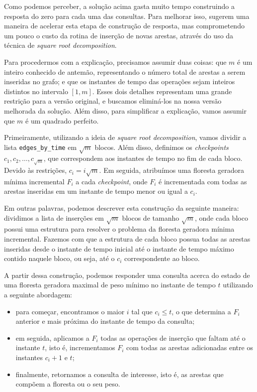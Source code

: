 Como podemos perceber, a solução acima gasta muito tempo construindo a resposta do zero para cada uma das consultas. Para melhorar isso, \citet{10.1093/comjnl/bxaa135} sugerem uma maneira de acelerar esta etapa de construção de resposta, mas comprometendo um pouco o custo da rotina de inserção de novas arestas, através do uso da técnica de \emph{square root decomposition}.

Para procedermos com a explicação, precisamos assumir duas coisas: que $m$ é um inteiro conhecido de antemão, representando o número total de arestas a serem inseridas no grafo; e que os instantes de tempo das operações sejam inteiros distintos no intervalo $[1,m]$. Esses dois detalhes representam uma grande restrição para a versão original, e buscamos eliminá-los na nossa versão melhorada da solução. Além disso, para simplificar a explicação, vamos assumir que $m$ é um quadrado perfeito.

Primeiramente, utilizando a ideia de \emph{square root decomposition}, vamos dividir a lista \texttt{edges\_by\_time} em $\sqrt{m}$ blocos. Além disso, definimos os \emph{checkpoints} $c_1, c_2, \dots, c_{\sqrt{m}}$, que correspondem aos instantes de tempo no fim de cada bloco. Devido às restrições, $c_i = i \sqrt{m}$. Em seguida, atribuímos uma floresta geradora mínima incremental $F_i$ a cada \emph{checkpoint}, onde $F_i$ é incrementada com todas as arestas inseridas em um instante de tempo menor ou igual a $c_i$.

Em outras palavras, podemos descrever esta construção da seguinte maneira: dividimos a lista de inserções em $\sqrt{m}$ blocos de tamanho $\sqrt{m}$, onde cada bloco possui uma estrutura para resolver o problema da floresta geradora mínima incremental. Fazemos com que a estrutura de cada bloco possua todas as arestas inseridas desde o instante de tempo inicial até o instante de tempo máximo contido naquele bloco, ou seja, até o $c_i$ correspondente ao bloco.

A partir dessa construção, podemos responder uma consulta acerca do estado de uma floresta geradora maximal de peso mínimo no instante de tempo $t$ utilizando a seguinte abordagem:

\begin{itemize}
    \item para começar, encontramos o maior $i$ tal que $c_i \leq t$, o que determina a $F_i$ anterior e mais próxima do instante de tempo da consulta;
    \item em seguida, aplicamos a $F_i$ todas as operações de inserção que faltam até o instante $t$, isto é, incrementamos $F_i$ com todas as arestas adicionadas entre os instantes $c_i + 1$ e $t$;
    \item finalmente, retornamos a consulta de interesse, isto é, as arestas que compõem a floresta ou o seu peso.
\end{itemize}

